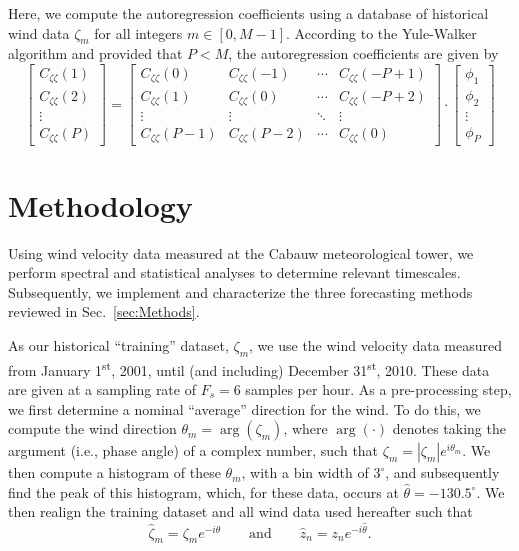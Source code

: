 \documentclass[11pt, oneside]{article}
\newcommand{\secref}[1]{Sec.~\ref{#1}}
\begin{document}
Here, we compute the autoregression coefficients using a database of historical wind data $\zeta_m$ for all integers $m \in [0, M-1]$.
According to the Yule-Walker algorithm and provided that $P < M$, the autoregression coefficients are given by
\begin{equation}
\begin{bmatrix}
C_{\zeta \zeta}(1) \\
C_{\zeta \zeta}(2) \\
\vdots \\
C_{\zeta \zeta}(P)
\end{bmatrix}
=
\begin{bmatrix}
C_{\zeta \zeta}(0) & C_{\zeta \zeta}(-1) & \cdots & C_{\zeta \zeta} (-P+1) \\
C_{\zeta \zeta}(1) & C_{\zeta \zeta}(0) & \cdots & C_{\zeta \zeta} (-P+2) \\
\vdots & \vdots & \ddots & \vdots \\
C_{\zeta \zeta}(P-1) & C_{\zeta \zeta}(P-2) & \cdots & C_{\zeta \zeta}(0)
\end{bmatrix}
\cdot
\begin{bmatrix}
\phi_1 \\
\phi_2 \\
\vdots \\
\phi_P
\end{bmatrix}
\end{equation}

\section{Methodology}\label{sec:Methodology}
Using wind velocity data measured at the Cabauw meteorological tower, we perform spectral and statistical analyses to determine relevant timescales.
Subsequently, we implement and characterize the three forecasting methods reviewed in \secref{sec:Methods}.

As our historical ``training'' dataset, $\zeta_m$, we use the wind velocity data measured from January 1\textsuperscript{st}, 2001, until (and including) December 31\textsuperscript{st}, 2010.
These data are given at a sampling rate of $F_s = 6$ samples per hour.
As a pre-processing step, we first determine a nominal ``average'' direction for the wind.
To do this, we compute the wind direction $\theta_m = \arg (\zeta_m)$, where $\arg ( \cdot )$ denotes taking the argument (i.e., phase angle) of a complex number, such that $\zeta_m = |\zeta_m| e^{i \theta_m}$.
We then compute a histogram of these $\theta_m$, with a bin width of $3^\circ$, and subsequently find the peak of this histogram, which, for these data, occurs at $\hat{\theta} = -130.5^\circ$.
We then realign the training dataset and all wind data used hereafter such that
\begin{equation}
\hat{\zeta}_m = \zeta_m e^{-i\hat{\theta}}
\quad\quad \text{and} \quad\quad
\hat{z}_n = z_n e^{-i\hat{\theta}}.
\end{equation}
\end{document}
